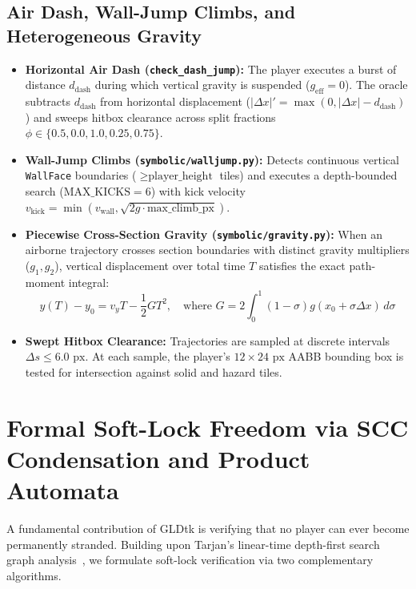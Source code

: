 \documentclass[11pt,a4paper]{report}
\theoremstyle{definition}
\theoremstyle{remark}
\begin{document}
\subsection{Air Dash, Wall-Jump Climbs, and Heterogeneous Gravity}
\begin{itemize}
    \item \textbf{Horizontal Air Dash (\texttt{check\_dash\_jump}):} The player executes a burst of distance $d_{\text{dash}}$ during which vertical gravity is suspended ($g_{\text{eff}} = 0$). The oracle subtracts $d_{\text{dash}}$ from horizontal displacement ($|\Delta x|' = \max(0, |\Delta x| - d_{\text{dash}})$) and sweeps hitbox clearance across split fractions $\phi \in \{0.5, 0.0, 1.0, 0.25, 0.75\}$.
    
    \item \textbf{Wall-Jump Climbs (\texttt{symbolic/walljump.py}):} Detects continuous vertical \texttt{WallFace} boundaries ($\ge \text{player\_height}$ tiles) and executes a depth-bounded search ($\text{MAX\_KICKS} = 6$) with kick velocity $v_{\text{kick}} = \min(v_{\text{wall}}, \sqrt{2g \cdot \text{max\_climb\_px}})$.
    
    \item \textbf{Piecewise Cross-Section Gravity (\texttt{symbolic/gravity.py}):} When an airborne trajectory crosses section boundaries with distinct gravity multipliers ($g_1, g_2$), vertical displacement over total time $T$ satisfies the exact path-moment integral:
    \begin{equation}
        y(T) - y_0 = v_y T - \frac{1}{2} G T^2, \quad \text{where } G = 2 \int_0^1 (1 - \sigma) g(x_0 + \sigma \Delta x)\,d\sigma
    \end{equation}
    
    \item \textbf{Swept Hitbox Clearance:} Trajectories are sampled at discrete intervals $\Delta s \le 6.0\text{ px}$. At each sample, the player's $12 \times 24\text{ px}$ AABB bounding box is tested for intersection against solid and hazard tiles.
\end{itemize}

\section{Formal Soft-Lock Freedom via SCC Condensation and Product Automata}
A fundamental contribution of GLDtk is verifying that no player can ever become permanently stranded. Building upon Tarjan's linear-time depth-first search graph analysis~\citep{tarjan1972depth}, we formulate soft-lock verification via two complementary algorithms.
\end{document}
